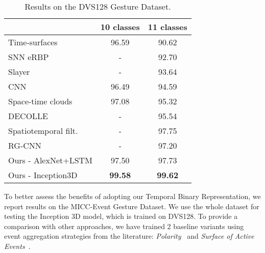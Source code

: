 \documentclass[a4paper,conference]{IEEEtran}
\begin{document}
\begin{table}[]
\caption{Results on the DVS128 Gesture Dataset.}
\label{tab:dvs128}
\centering
\begin{tabular}{l|c|c}
                                                    & 10 classes                & 11 classes                     \\ \hline
Time-surfaces~\cite{maro2020event}                  & 96.59                     & 90.62                          \\
SNN eRBP\cite{kaiser2019embodied}                   & -                         & 92.70                          \\
Slayer~\cite{shrestha2018slayer}                    & -                         & 93.64                          \\
CNN~\cite{amir2017low}                              & 96.49                     & 94.59                          \\
Space-time clouds~\cite{wang2019space}              & 97.08                     & 95.32                          \\
DECOLLE~\cite{kaiser2020synaptic}                   & -                         & 95.54                          \\
Spatiotemporal filt.~\cite{ghosh2019spatiotemporal} & -                         & 97.75                          \\
RG-CNN~\cite{bi2019graph}                           & -                         & 97.20                          \\ \hline
Ours - AlexNet+LSTM                                 & 97.50                     & 97.73                          \\
Ours - Inception3D                                  & \textbf{99.58}                     & \textbf{99.62}                 
\end{tabular}
\end{table}



To better assess the benefits of adopting our Temporal Binary Representation, we report results on the MICC-Event Gesture Dataset. We use the whole dataset for testing the Inception 3D model, which is trained on DVS128. To provide a comparison with other approaches, we have trained 2 baseline variants using event aggregation strategies from the literature: \textit{Polarity}~\cite{nguyen2019real} and \textit{Surface of Active Events}~\cite{mueggler2017fast}.
\end{document}
